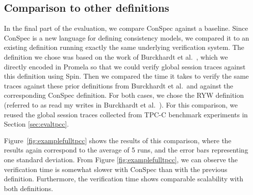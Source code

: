 \documentclass[journal,compsoc]{IEEEtran}
\begin{document}
\subsection{Comparison to other definitions}\label{sec:evalcompar}


In the final part of the evaluation, we compare ConSpec against a baseline. Since ConSpec is a new language for defining consistency models, we compared it to an existing definition running exactly the same underlying verification system. The definition we chose was based on the work of Burckhardt et al.~\cite{Burckhardt:2014:PEC:2693641.2693642}, which we directly encoded in Promela so that we could verify global session traces against this definition using Spin. Then we compared the time it takes to verify the same traces against these prior definitions from Burckhardt et al.\ and against the corresponding ConSpec definition. For both cases, we chose the RYW definition (referred to as read my writes in Burckhardt et al.~\cite{Burckhardt:2014:PEC:2693641.2693642}). For this comparison, we reused the global session traces collected from TPC-C benchmark experiments in Section \ref{sec:evaltpcc}.



Figure~\ref{fig:examplefulltpcc} shows the results of this comparison, where the results again correspond to the average of 5 runs, and the error bars representing one standard deviation. From Figure \ref{fig:examplefulltpcc}, we can observe the verification time is somewhat slower with ConSpec than with the previous definition. Furthermore, the verification time shows comparable scalability with both definitions.
\end{document}
